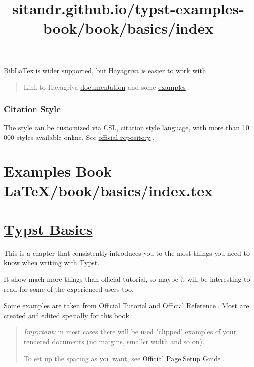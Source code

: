 BibLaTex is wider supported, but Hayagriva is easier to work with.

\begin{quote}
Link to Hayagriva
\href{https://github.com/typst/hayagriva/blob/main/docs/file-format.md}{documentation}
and some
\href{https://github.com/typst/hayagriva/blob/main/tests/data/basic.yml}{examples}
.
\end{quote}

\subsubsection{\texorpdfstring{\hyperref[citation-style]{Citation
Style}}{Citation Style}}\label{citation-style}

The style can be customized via CSL, citation style language, with more
than 10 000 styles available online. See
\href{https://github.com/citation-style-language/styles}{official
repository} .


\section{Examples Book LaTeX/book/basics/index.tex}
\title{sitandr.github.io/typst-examples-book/book/basics/index}

\section{\texorpdfstring{\hyperref[typst-basics]{Typst
Basics}}{Typst Basics}}\label{typst-basics}

This is a chapter that consistently introduces you to the most things
you need to know when writing with Typst.

It show much more things than official tutorial, so maybe it will be
interesting to read for some of the experienced users too.

Some examples are taken from
\href{https://typst.app/docs/tutorial/}{Official Tutorial} and
\href{https://typst.app/docs/reference/}{Official Reference} . Most are
created and edited specially for this book.

\begin{quote}
\emph{Important:} in most cases there will be used "clipped" examples of
your rendered documents (no margins, smaller width and so on).

To set up the spacing as you want, see
\href{https://typst.app/docs/guides/page-setup-guide/}{Official Page
Setup Guide} .
\end{quote}


